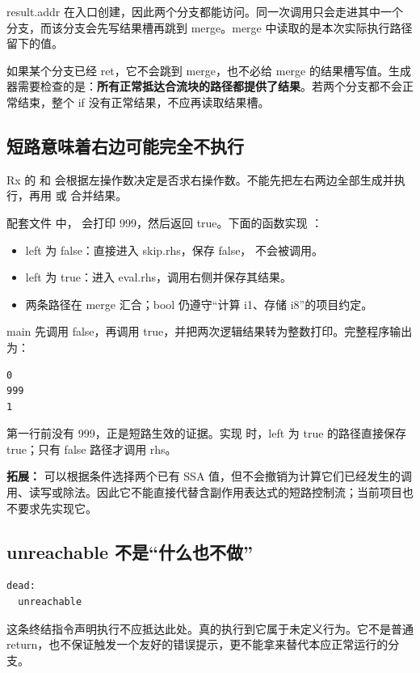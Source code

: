 result.addr 在入口创建，因此两个分支都能访问。同一次调用只会走进其中一个分支，而该分支会先写结果槽再跳到 merge。merge 中读取的是本次实际执行路径留下的值。

如果某个分支已经 ret，它不会跳到 merge，也不必给 merge 的结果槽写值。生成器需要检查的是：\textbf{所有正常抵达合流块的路径都提供了结果}。若两个分支都不会正常结束，整个 if 没有正常结果，不应再读取结果槽。

\subsection{短路意味着右边可能完全不执行}
Rx 的 \code{\&\&} 和 \code{||} 会根据左操作数决定是否求右操作数。不能先把左右两边全部生成并执行，再用  或  合并结果。

配套文件  中， 会打印 999，然后返回 true。下面的函数实现 ：


\begin{itemize}
 \item left 为 false：直接进入 skip.rhs，保存 false， 不会被调用。
 \item left 为 true：进入 eval.rhs，调用右侧并保存其结果。
 \item 两条路径在 merge 汇合；bool 仍遵守“计算 i1、存储 i8”的项目约定。
\end{itemize}
main 先调用 false，再调用 true，并把两次逻辑结果转为整数打印。完整程序输出为：
\begin{lstlisting}[language={},numbers=none]
0
999
1
\end{lstlisting}
第一行前没有 999，正是短路生效的证据。实现  时，left 为 true 的路径直接保存 true；只有 false 路径才调用 rhs。

\textbf{拓展：} 可以根据条件选择两个已有 SSA 值，但不会撤销为计算它们已经发生的调用、读写或除法。因此它不能直接代替含副作用表达式的短路控制流；当前项目也不要求先实现它。

\subsection{unreachable 不是“什么也不做”}
\begin{lstlisting}
dead:
  unreachable
\end{lstlisting}
这条终结指令声明执行不应抵达此处。真的执行到它属于未定义行为。它不是普通 return，也不保证触发一个友好的错误提示，更不能拿来替代本应正常运行的分支。

